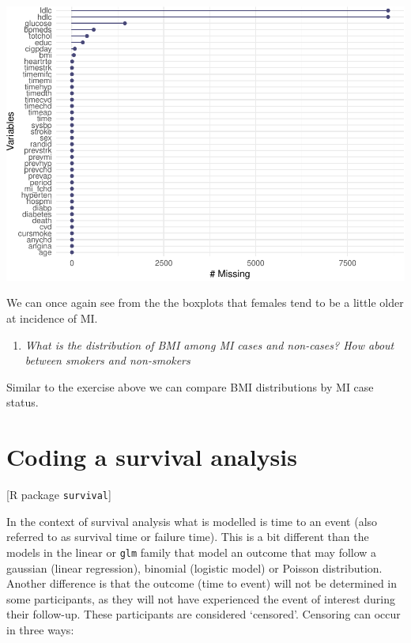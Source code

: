 \documentclass[
]{book}
\providecommand{\tightlist}{%
  \setlength{\itemsep}{0pt}\setlength{\parskip}{0pt}}
\begin{document}
\includegraphics{adv_epi_analysis_files/figure-latex/unnamed-chunk-174-1.pdf}

We can once again see from the the boxplots that females tend to be a little older at incidence of MI.

\begin{enumerate}
\def\labelenumi{\arabic{enumi}.}
\setcounter{enumi}{4}
\tightlist
\item
  \emph{What is the distribution of BMI among MI cases and non-cases? How about between smokers and non-smokers}
\end{enumerate}

Similar to the exercise above we can compare BMI distributions by MI case status.

\hypertarget{coding-a-survival-analysis}{%
\section{Coding a survival analysis}\label{coding-a-survival-analysis}}

{[}R package \texttt{survival}{]}

In the context of survival analysis what is modelled is time to an event (also referred to as survival time or failure time). This is a bit different than the models in the linear or \texttt{glm} family that model an outcome that may follow a gaussian (linear regression), binomial (logistic model) or Poisson distribution. Another difference is that the outcome (time to event) will not be determined in some participants, as they will not have experienced the event of interest during their follow-up. These participants are considered `censored'. Censoring can occur in three ways:
\end{document}
